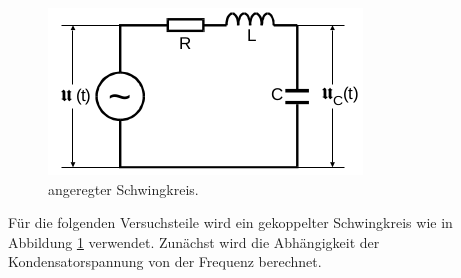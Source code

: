 \begin{figure}[H]
  \centering
  \includegraphics{content/images/kreis2.png}
  \caption{angeregter Schwingkreis.}
  \label{fig:kreis2}
\end{figure}

Für die folgenden Versuchsteile wird ein gekoppelter Schwingkreis
wie in Abbildung \ref{fig:kreis2} verwendet. Zunächst wird die Abhängigkeit
der Kondensatorspannung von der Frequenz berechnet.
